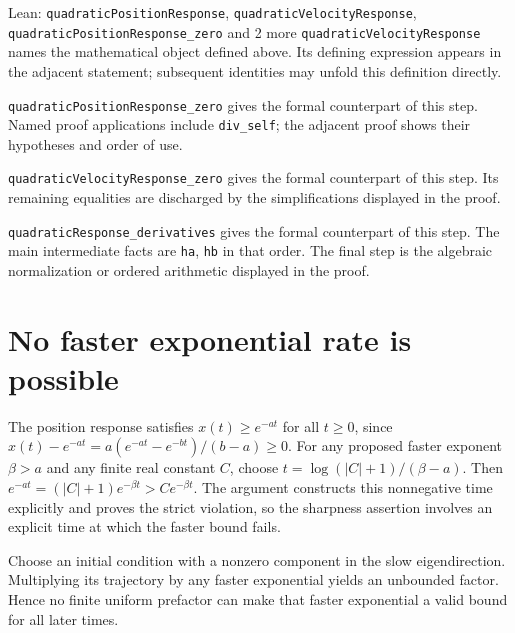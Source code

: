 \documentclass[11pt,a4paper]{article}
\begin{document}
\begin{leanbox}{Lean: \texttt{quadraticPositionResponse}, \texttt{quadraticVelocityResponse}, \texttt{quadraticPositionResponse\_\allowbreak{}zero} and 2 more}
\texttt{quadratic\allowbreak{}Velocity\allowbreak{}Response} names the mathematical object defined above. Its defining expression appears in the adjacent statement; subsequent identities may unfold this definition directly.




\texttt{quadratic\allowbreak{}Position\allowbreak{}Response\_\allowbreak{}zero} gives the formal counterpart of this step. Named proof applications include \texttt{div\_\allowbreak{}self}; the adjacent proof shows their hypotheses and order of use.




\texttt{quadratic\allowbreak{}Velocity\allowbreak{}Response\_\allowbreak{}zero} gives the formal counterpart of this step. Its remaining equalities are discharged by the simplifications displayed in the proof.




\texttt{quadratic\allowbreak{}Response\_\allowbreak{}derivatives} gives the formal counterpart of this step. The main intermediate facts are \texttt{ha}, \texttt{hb} in that order. The final step is the algebraic normalization or ordered arithmetic displayed in the proof.
\end{leanbox}

\section{\texorpdfstring{No faster exponential rate is possible}{No faster exponential rate is possible}}


The position response satisfies \(x(t)\ge e^{-at}\) for all \(t\ge0\), since \(x(t)-e^{-at}=a(e^{-at}-e^{-bt})/(b-a)\ge0\). For any proposed faster exponent \(\beta>a\) and any finite real constant \(C\), choose \(t=\log(|C|+1)/(\beta-a)\). Then \(e^{-at}=(|C|+1)e^{-\beta t}>Ce^{-\beta t}\). The argument constructs this nonnegative time explicitly and proves the strict violation, so the sharpness assertion involves an explicit time at which the faster bound fails.



Choose an initial condition with a nonzero component in the slow eigendirection. Multiplying its trajectory by any faster exponential yields an unbounded factor. Hence no finite uniform prefactor can make that faster exponential a valid bound for all later times.
\end{document}
